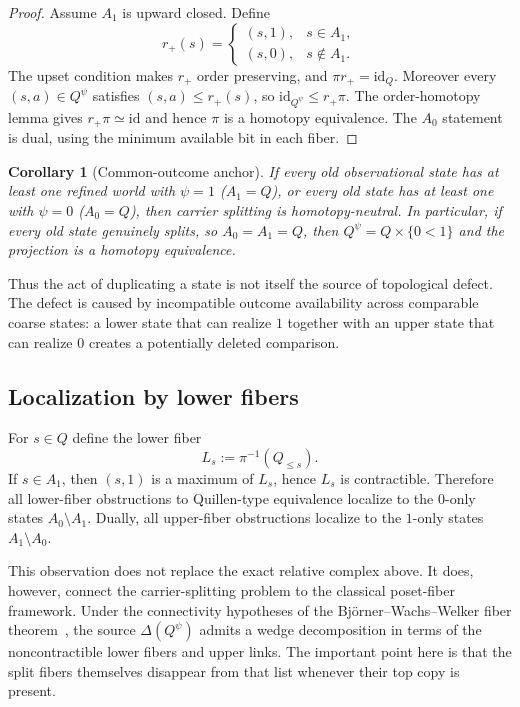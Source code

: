\documentclass[11pt]{article}
\newtheorem{corollary}[theorem]{Corollary}
\begin{document}
\begin{proof}
Assume $A_1$ is upward closed.  Define
\[
 r_+(s)=
 \begin{cases}
 (s,1),&s\in A_1,\\
 (s,0),&s\notin A_1.
 \end{cases}
\]
The upset condition makes $r_+$ order preserving, and $\pi r_+=\mathrm{id}_Q$.
Moreover every $(s,a)\in Q^\psi$ satisfies $(s,a)\leq r_+(s)$, so
$\mathrm{id}_{Q^\psi}\leq r_+\pi$.  The order-homotopy lemma gives
$r_+\pi\simeq\mathrm{id}$ and hence $\pi$ is a homotopy equivalence.  The
$A_0$ statement is dual, using the minimum available bit in each fiber.
\end{proof}

\begin{corollary}[Common-outcome anchor]
If every old observational state has at least one refined world with $\psi=1$
($A_1=Q$), or every old state has at least one with $\psi=0$ ($A_0=Q$), then
carrier splitting is homotopy-neutral.  In particular, if every old state genuinely
splits, so $A_0=A_1=Q$, then $Q^\psi=Q\times\{0<1\}$ and the projection is a
homotopy equivalence.
\end{corollary}

Thus the act of duplicating a state is not itself the source of topological defect.
The defect is caused by incompatible outcome availability across comparable coarse
states: a lower state that can realize $1$ together with an upper state that can
realize $0$ creates a potentially deleted comparison.

\subsection{Localization by lower fibers}

For $s\in Q$ define the lower fiber
\[
 L_s:=\pi^{-1}(Q_{\leq s}).
\]
If $s\in A_1$, then $(s,1)$ is a maximum of $L_s$, hence $L_s$ is
contractible.  Therefore all lower-fiber obstructions to Quillen-type equivalence
localize to the $0$-only states $A_0\setminus A_1$.  Dually, all upper-fiber
obstructions localize to the $1$-only states $A_1\setminus A_0$.

This observation does not replace the exact relative complex above.  It does,
however, connect the carrier-splitting problem to the classical poset-fiber
framework.  Under the connectivity hypotheses of the Bj\"orner--Wachs--Welker
fiber theorem~\cite{BjornerWachsWelker2005}, the source $\Delta(Q^\psi)$ admits a wedge decomposition in terms
of the noncontractible lower fibers and upper links.  The important point here is
that the split fibers themselves disappear from that list whenever their top copy
is present.
\end{document}
